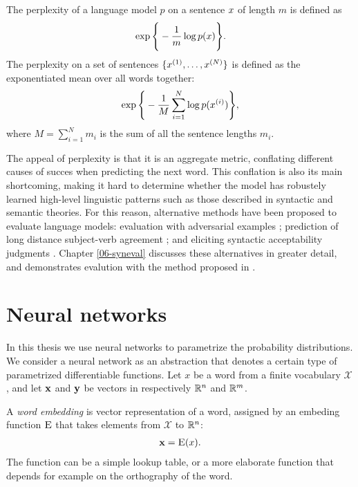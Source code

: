     \begin{definition}{} The perplexity of a language model $p$ on a sentence $x$ of length $m$ is defined as
    \begin{align*}
      \exp \Bigg\{ - \frac{1}{m} \log p( x ) \Bigg\}.
    \end{align*}
    The perplexity on a set of sentences $\{ x^{(1)}, \dots, x^{(N)} \}$ is defined as the exponentiated mean over all words together:
    \begin{align*}
      \exp \Bigg\{ - \frac{1}{M} \sum_{i=1}^N \log p( x^{(i)} ) \Bigg\},
    \end{align*}
    where $M = \sum_{i=1}^N m_i$ is the sum of all the sentence lengths $m_i$.
    \end{definition}

   The appeal of perplexity is that it is an aggregate metric, conflating different causes of succes when predicting the next word. This conflation is also its main shortcoming, making it hard to determine whether the model has robustely learned high-level linguistic patterns such as those described in syntactic and semantic theories. For this reason, alternative methods have been proposed to evaluate language models: evaluation with adversarial examples \citep{smith2012adversarial}; prediction of long distance subject-verb agreement \citep{linzen2016syntax}; and eliciting syntactic acceptability judgments \citep{linzen2018targeted}. Chapter \ref{06-syneval} discusses these alternatives in greater detail, and demonstrates evalution with the method proposed in \citep{linzen2018targeted}.


\section{Neural networks}

  In this thesis we use neural networks to parametrize the probability distributions. We consider a neural network as an abstraction that denotes a certain type of parametrized differentiable functions. Let $x$ be a word from a finite vocabulary $\mathcal{X}$, and let $\mathbf{x}$ and $\mathbf{y}$ be vectors in respectively $\mathbb{R}^{n}$ and $\mathbb{R}^{m}$.

  \begin{definition}{} A \textit{word embedding} is vector representation of a word, assigned by an embeding function $\textsc{E}$ that takes elements from $\mathcal{X}$ to $\mathbb{R}^{n}$:
  \begin{align*}
    \mathbf{x} = \textsc{E}( x ).
  \end{align*}
  The function can be a simple lookup table, or a more elaborate function that depends for example on the orthography of the word.
  \end{definition}

